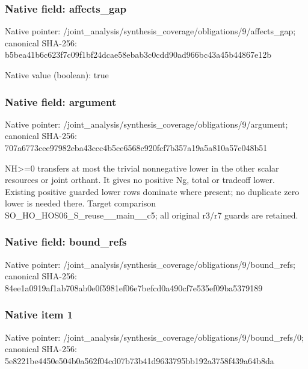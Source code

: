 \documentclass[10pt,a4paper]{article}
\begin{document}
\subsubsection{Native field: affects\_\allowbreak{}gap}
Native pointer: /joint\_\allowbreak{}analysis/synthesis\_\allowbreak{}coverage/obligations/9/affects\_\allowbreak{}gap; canonical SHA-256: b5bea41b6c623f7c09f1bf24dcae58ebab3c0cdd90ad966bc43a45b44867e12b

Native value (boolean): true

\subsubsection{Native field: argument}
Native pointer: /joint\_\allowbreak{}analysis/synthesis\_\allowbreak{}coverage/obligations/9/argument; canonical SHA-256: 707a6773cee97982eba43ccc4b5ce6568c920fcf7b357a19a5a810a57e048b51

\begingroup\raggedright\sloppy NH>=\allowbreak{}0 transfers at most the trivial nonnegative lower in the other scalar resources or joint orthant. It gives no positive Ng,\allowbreak{} total or tradeoff lower. Existing positive guarded lower rows dominate where present;\allowbreak{} no duplicate zero lower is needed there. Target comparison SO\_\allowbreak{}HO\_\allowbreak{}HOS06\_\allowbreak{}S\_\allowbreak{}reuse\_\allowbreak{}\_\allowbreak{}main\_\allowbreak{}\_\allowbreak{}c5;\allowbreak{} all original r3/\allowbreak{}r7 guards are retained.\par\endgroup

\subsubsection{Native field: bound\_\allowbreak{}refs}
Native pointer: /joint\_\allowbreak{}analysis/synthesis\_\allowbreak{}coverage/obligations/9/bound\_\allowbreak{}refs; canonical SHA-256: 84ee1a0919af1ab708ab0e0f5981ef06e7befcd0a490cf7e535ef09ba5379189

\subsubsection{Native item 1}
Native pointer: /joint\_\allowbreak{}analysis/synthesis\_\allowbreak{}coverage/obligations/9/bound\_\allowbreak{}refs/0; canonical SHA-256: 5e8221be4450e504b0a562f04cd07b73b41d9633795bb192a3758f439a64b8da
\end{document}
